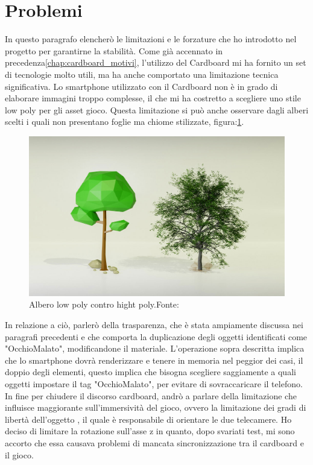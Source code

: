 \documentclass[
a4paper,
cleardoublepage=empty,
headings=twolinechapter,
numbers=autoenddot,
]{scrbook}
\begin{document}
    \section{Problemi}
    In questo paragrafo elencherò le limitazioni e le forzature che ho introdotto nel progetto per garantirne la stabilità. Come già accennato in precedenza\ref{chap:cardboard_motivi}, l'utilizzo del Cardboard mi ha fornito un set di tecnologie molto utili, ma ha anche comportato una limitazione tecnica significativa. Lo smartphone utilizzato con il Cardboard non è in grado di elaborare immagini troppo complesse, il che mi ha costretto a scegliere uno stile low poly per gli asset  gioco.
    Questa limitazione si può anche osservare dagli alberi scelti i quali non presentano foglie ma chiome stilizzate, figura:\ref{fig:low_hight}.
    \begin{figure}[H]
		\centering
		\includegraphics[width=0.6\linewidth]{image/low_hight}
		\caption{Albero low poly contro hight poly.Fonte:\cite{low_high}}
		\label{fig:low_hight}
    \end{figure}
    In relazione a ciò, parlerò della trasparenza, che è stata ampiamente discussa nei paragrafi precedenti e che comporta la duplicazione degli oggetti identificati come "OcchioMalato", modificandone il materiale.
    L'operazione sopra descritta implica che lo smartphone dovrà renderizzare e tenere in memoria nel peggior dei casi, il doppio degli elementi, questo implica che bisogna scegliere saggiamente a quali oggetti impostare il tag "OcchioMalato", per evitare di sovraccaricare il telefono.
    In fine per chiudere il discorso cardboard, andrò a parlare della limitazione che influisce maggiorante sull'immersività del gioco, ovvero la limitazione dei gradi di libertà dell'oggetto , il quale è responsabile di orientare le due telecamere.
    Ho deciso di limitare la rotazione sull'asse z in quanto, dopo svariati test, mi sono accorto che essa causava problemi di mancata sincronizzazione tra il cardboard e il gioco.\\\\
\end{document}
